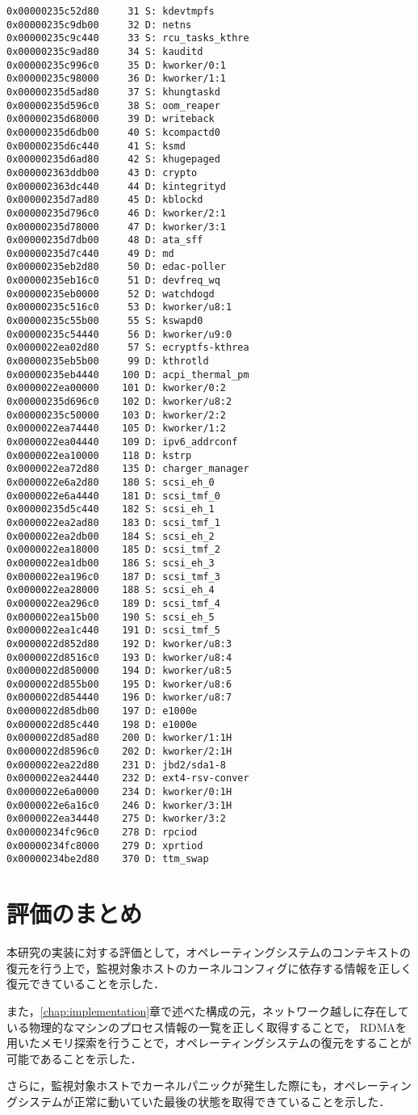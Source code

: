 \begin{itembox}[l]{}
\begin{verbatim}
0x00000235c52d80     31 S: kdevtmpfs
0x00000235c9db00     32 D: netns
0x00000235c9c440     33 S: rcu_tasks_kthre
0x00000235c9ad80     34 S: kauditd
0x00000235c996c0     35 D: kworker/0:1
0x00000235c98000     36 D: kworker/1:1
0x00000235d5ad80     37 S: khungtaskd
0x00000235d596c0     38 S: oom_reaper
0x00000235d68000     39 D: writeback
0x00000235d6db00     40 S: kcompactd0
0x00000235d6c440     41 S: ksmd
0x00000235d6ad80     42 S: khugepaged
0x000002363ddb00     43 D: crypto
0x000002363dc440     44 D: kintegrityd
0x00000235d7ad80     45 D: kblockd
0x00000235d796c0     46 D: kworker/2:1
0x00000235d78000     47 D: kworker/3:1
0x00000235d7db00     48 D: ata_sff
0x00000235d7c440     49 D: md
0x00000235eb2d80     50 D: edac-poller
0x00000235eb16c0     51 D: devfreq_wq
0x00000235eb0000     52 D: watchdogd
0x00000235c516c0     53 D: kworker/u8:1
0x00000235c55b00     55 S: kswapd0
0x00000235c54440     56 D: kworker/u9:0
0x0000022ea02d80     57 S: ecryptfs-kthrea
0x00000235eb5b00     99 D: kthrotld
0x00000235eb4440    100 D: acpi_thermal_pm
0x0000022ea00000    101 D: kworker/0:2
0x00000235d696c0    102 D: kworker/u8:2
0x00000235c50000    103 D: kworker/2:2
0x0000022ea74440    105 D: kworker/1:2
0x0000022ea04440    109 D: ipv6_addrconf
0x0000022ea10000    118 D: kstrp
0x0000022ea72d80    135 D: charger_manager
0x0000022e6a2d80    180 S: scsi_eh_0
0x0000022e6a4440    181 D: scsi_tmf_0
0x00000235d5c440    182 S: scsi_eh_1
0x0000022ea2ad80    183 D: scsi_tmf_1
0x0000022ea2db00    184 S: scsi_eh_2
0x0000022ea18000    185 D: scsi_tmf_2
0x0000022ea1db00    186 S: scsi_eh_3
0x0000022ea196c0    187 D: scsi_tmf_3
0x0000022ea28000    188 S: scsi_eh_4
0x0000022ea296c0    189 D: scsi_tmf_4
0x0000022ea15b00    190 S: scsi_eh_5
0x0000022ea1c440    191 D: scsi_tmf_5
0x0000022d852d80    192 D: kworker/u8:3
0x0000022d8516c0    193 D: kworker/u8:4
0x0000022d850000    194 D: kworker/u8:5
0x0000022d855b00    195 D: kworker/u8:6
0x0000022d854440    196 D: kworker/u8:7
0x0000022d85db00    197 D: e1000e
0x0000022d85c440    198 D: e1000e
0x0000022d85ad80    200 D: kworker/1:1H
0x0000022d8596c0    202 D: kworker/2:1H
0x0000022ea22d80    231 D: jbd2/sda1-8
0x0000022ea24440    232 D: ext4-rsv-conver
0x0000022e6a0000    234 D: kworker/0:1H
0x0000022e6a16c0    246 D: kworker/3:1H
0x0000022ea34440    275 D: kworker/3:2
0x00000234fc96c0    278 D: rpciod
0x00000234fc8000    279 D: xprtiod
0x00000234be2d80    370 D: ttm_swap
    \end{verbatim}
\end{itembox}

\section{評価のまとめ}

本研究の実装に対する評価として，オペレーティングシステムのコンテキストの復元を行う上で，監視対象ホストのカーネルコンフィグに依存する情報を正しく復元できていることを示した．

また，\ref{chap:implementation}章で述べた構成の元，ネットワーク越しに存在している物理的なマシンのプロセス情報の一覧を正しく取得することで，
RDMAを用いたメモリ探索を行うことで，オペレーティングシステムの復元をすることが可能であることを示した．

さらに，監視対象ホストでカーネルパニックが発生した際にも，オペレーティングシステムが正常に動いていた最後の状態を取得できていることを示した．

